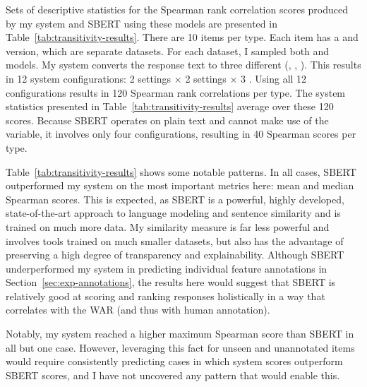 Sets of descriptive statistics for the Spearman rank correlation scores produced by my system and SBERT using these models are presented in Table~\ref{tab:transitivity-results}. There are 10 items per type. Each item has a  and  version, which are separate datasets. For each dataset, I sampled both  and  models. My system converts the response text to three different  (, , ). This results in 12 system configurations: 2  settings $\times$ 2  settings $\times$ 3 . Using all 12 configurations results in 120 Spearman rank correlations per  type. The system statistics presented in Table~\ref{tab:transitivity-results} average over these 120 scores. Because SBERT operates on plain text and cannot make use of the  variable, it involves only four configurations, resulting in 40 Spearman scores per  type.

Table~\ref{tab:transitivity-results} shows some notable patterns. In all cases, SBERT outperformed my system on the most important metrics here: mean and median Spearman scores. This is expected, as SBERT is a powerful, highly developed, state-of-the-art approach to language modeling and sentence similarity and is trained on much more data. My similarity measure is far less powerful and involves tools trained on much smaller datasets, but also has the advantage of preserving a high degree of transparency and explainability. Although SBERT underperformed my system in predicting individual feature annotations in Section~\ref{sec:exp-annotations}, the results here would suggest that SBERT is relatively good at scoring and ranking responses holistically in a way that correlates with the WAR (and thus with human annotation).

Notably, my system reached a higher maximum Spearman score than SBERT in all but one case. However, leveraging this fact for unseen and unannotated items would require consistently predicting cases in which system scores outperform SBERT scores, and I have not uncovered any pattern that would enable this.

